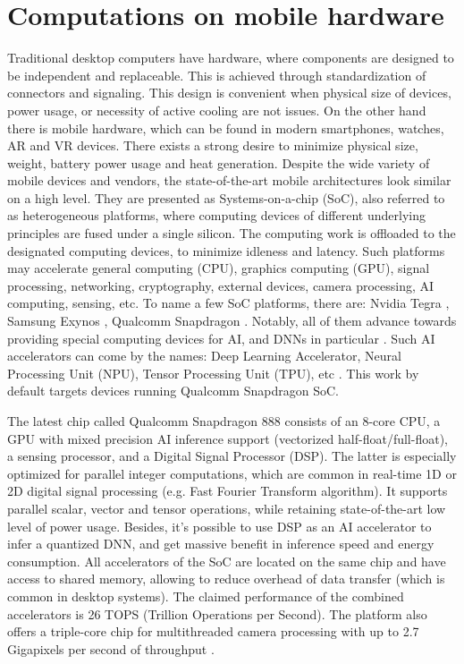 %

\section{Computations on mobile hardware}
\label{lit:mobile}

Traditional desktop computers have hardware, where components are designed to be independent and replaceable. This is achieved through standardization of connectors and signaling. This design is convenient when physical size of devices, power usage, or necessity of active cooling are not issues. On the other hand there is mobile hardware, which can be found in modern smartphones, watches, AR and VR devices. There exists a strong desire to minimize physical size, weight, battery power usage and heat generation. Despite the wide variety of mobile devices and vendors, the state-of-the-art mobile architectures look similar on a high level. They are presented as Systems-on-a-chip (SoC), also referred to as heterogeneous platforms, where computing devices of different underlying principles are fused under a single silicon. The computing work is offloaded to the designated computing devices, to minimize idleness and latency. Such platforms may accelerate general computing (CPU), graphics computing (GPU), signal processing, networking, cryptography, external devices, camera processing, AI computing, sensing, etc. To name a few SoC platforms, there are: Nvidia Tegra \cite{soc:nvidia-tegra}, Samsung Exynos \cite{soc:exynos}, Qualcomm Snapdragon \cite{soc:snapdragon}. Notably, all of them advance towards providing special computing devices for AI, and DNNs in particular \cite{mobile:dl-review19}. Such AI accelerators can come by the names: Deep Learning Accelerator, Neural Processing Unit (NPU), Tensor Processing Unit (TPU), etc \cite{soc:tops}. This work by default targets devices running Qualcomm Snapdragon SoC.

The latest chip called Qualcomm Snapdragon 888 consists of an 8-core CPU, a GPU with mixed precision AI inference support (vectorized half-float/full-float), a sensing processor, and a Digital Signal Processor (DSP). The latter is especially optimized for parallel integer computations, which are common in real-time 1D or 2D digital signal processing (e.g. Fast Fourier Transform algorithm). It supports parallel scalar, vector and tensor operations, while retaining state-of-the-art low level of power usage. Besides, it's possible to use DSP as an AI accelerator to infer a quantized DNN, and get massive benefit in inference speed and energy consumption. All accelerators of the SoC are located on the same chip and have access to shared memory, allowing to reduce overhead of data transfer (which is common in desktop systems). The claimed performance of the combined accelerators is 26 TOPS (Trillion Operations per Second). The platform also offers a triple-core chip for multithreaded camera processing with up to 2.7 Gigapixels per second of throughput \cite{soc:snapdragon888}.

